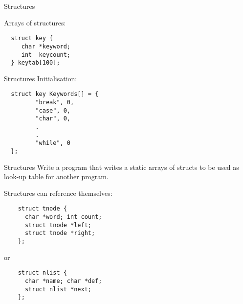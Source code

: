 \begin{frame}[fragile]{Structures}

Arrays of structures:
\begin{tt}
\begin{verbatim}
  struct key {
     char *keyword;
     int  keycount;
  } keytab[100];
\end{verbatim}
\end{tt}


\end{frame}
\begin{frame}[fragile]{Structures}
Initialisation:


\vspace{20pt}

\begin{tt}
\begin{verbatim}
  struct key Keywords[] = {
         "break", 0,
         "case", 0,
         "char", 0,
         .
         .
         "while", 0
  };
\end{verbatim}
\end{tt}


\end{frame}
\begin{frame}[fragile]{Structures}
Write a program that writes a static arrays of structs to be used
as look-up table for another program.


\vspace{20pt}

Structures can reference themselves:


\vspace{10pt}

\begin{tt}
\begin{verbatim}
    struct tnode {
      char *word; int count;
      struct tnode *left;
      struct tnode *right;
    };
\end{verbatim}
\end{tt}


\vspace{10pt}

or

\vspace{10pt}

\begin{tt}
\begin{verbatim}
    struct nlist {
      char *name; char *def;
      struct nlist *next;
    };
\end{verbatim}
\end{tt}

\end{frame}
